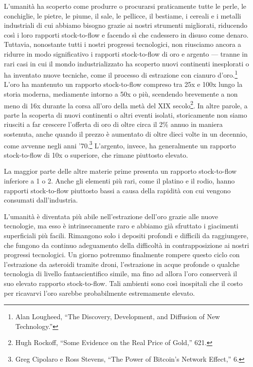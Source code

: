 \documentclass[
  a5paper,
  smalldemyvopaper,10pt,twoside,onecolumn,openright,extrafontsizes,hidelinks]{memoir}
\begin{document}
L'umanità ha scoperto come produrre o procurarsi praticamente tutte le
perle, le conchiglie, le pietre, le piume, il sale, le pellicce, il
bestiame, i cereali e i metalli industriali di cui abbiamo bisogno
grazie ai nostri strumenti migliorati, riducendo così i loro rapporti
stock-to-flow e facendo sì che cadessero in disuso come denaro.
Tuttavia, nonostante tutti i nostri progressi tecnologici, non riusciamo
ancora a ridurre in modo significativo i rapporti stock-to-flow di oro e
argento --- tranne in rari casi in cui il mondo industrializzato ha
scoperto nuovi continenti inesplorati o ha inventato nuove tecniche,
come il processo di estrazione con cianuro d'oro.\footnote{Alan
  Lougheed, ``The Discovery, Development, and Diffusion of New
  Technology.''} L'oro ha mantenuto un rapporto stock-to-flow compreso
tra 25x e 100x lungo la storia moderna, mediamente intorno a 50x o più,
scendendo brevemente a non meno di 16x durante la corsa all'oro della
metà del XIX secolo\footnote{Hugh Rockoff, ``Some Evidence on the Real
  Price of Gold,'' 621.}. In altre parole, a parte la scoperta di nuovi
continenti o altri eventi isolati, storicamente non siamo riusciti a far
crescere l'offerta di oro di oltre circa il 2\% annuo in maniera
sostenuta, anche quando il prezzo è aumentato di oltre dieci volte in un
decennio, come avvenne negli anni '70.\footnote{Greg Cipolaro e Ross
  Stevens, ``The Power of Bitcoin's Network Effect,'' 6.} L'argento,
invece, ha generalmente un rapporto stock-to-flow di 10x o superiore,
che rimane piuttosto elevato.

La maggior parte delle altre materie prime presenta un rapporto
stock-to-flow inferiore a 1 o 2. Anche gli elementi più rari, come il
platino e il rodio, hanno rapporti stock-to-flow piuttosto bassi a causa
della rapidità con cui vengono consumati dall'industria.

L'umanità è diventata più abile nell'estrazione dell'oro grazie alle
nuove tecnologie, ma esso è intrinsecamente raro e abbiamo già sfruttato
i giacimenti superficiali più facili. Rimangono solo i depositi profondi
e difficili da raggiungere, che fungono da continuo adeguamento della
difficoltà in contrapposizione ai nostri progressi tecnologici. Un
giorno potremmo finalmente rompere questo ciclo con l'estrazione da
asteroidi tramite droni, l'estrazione in acque profonde o qualche
tecnologia di livello fantascientifico simile, ma fino ad allora l'oro
conserverà il suo elevato rapporto stock-to-flow. Tali ambienti sono
così inospitali che il costo per ricavarvi l'oro sarebbe probabilmente
estremamente elevato.
\end{document}
